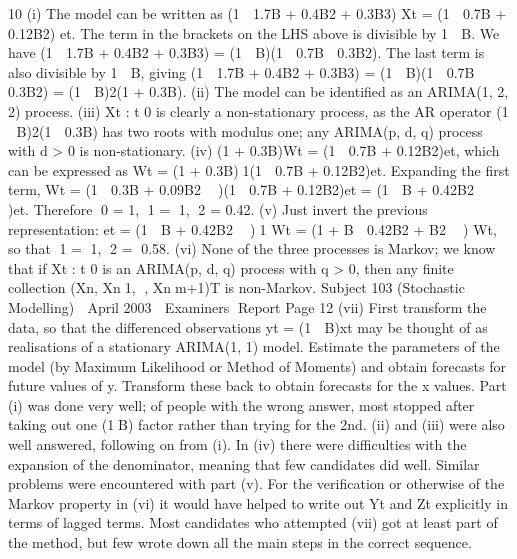 10 (i) The model can be written as
(1  1.7B + 0.4B2 + 0.3B3) Xt = (1  0.7B + 0.12B2) et.
The term in the brackets on the LHS above is divisible by 1  B. We have
(1  1.7B + 0.4B2 + 0.3B3) = (1  B)(1  0.7B  0.3B2).
The last term is also divisible by 1  B, giving
(1  1.7B + 0.4B2 + 0.3B3) = (1  B)(1  0.7B  0.3B2) = (1  B)2(1 + 0.3B).
(ii) The model can be identified as an ARIMA(1, 2, 2) process.
(iii) {Xt : t 
 0} is clearly a non-stationary process, as the AR operator
(1  B)2(1  0.3B) has two roots with modulus one; any ARIMA(p, d, q)
process with d > 0 is non-stationary.
(iv) (1 + 0.3B)Wt = (1  0.7B + 0.12B2)et, which can be expressed as
Wt = (1 + 0.3B)1(1 	0.7B + 0.12B2)et.
Expanding the first term, Wt = (1  0.3B + 0.09B2  )(1  0.7B + 0.12B2)et
= (1  B + 0.42B2  )et.
Therefore 0 = 1, 1 = 1, 2 = 0.42.
(v) Just invert the previous representation: et = (1  B + 0.42B2  )1 Wt = (1 +
B  0.42B2 + B2  ) Wt, so that 1 = 1, 2 = 0.58.
(vi) None of the three processes is Markov; we know that if {Xt : t 
 0} is an
ARIMA(p, d, q) process with q > 0, then any finite collection (Xn, Xn1, ,
Xnm+1)T is non-Markov.
Subject 103 (Stochastic Modelling)  April 2003  Examiners Report
Page 12
(vii) First transform the data, so that the differenced observations yt = (1  B)xt may
be thought of as realisations of a stationary ARIMA(1, 1) model.
Estimate the parameters of the model (by Maximum Likelihood or Method of
Moments) and obtain forecasts for future values of y.
Transform these back to obtain forecasts for the x values.
Part (i) was done very well; of people with the wrong answer, most stopped after
taking out one (1B) factor rather than trying for the 2nd. (ii) and (iii) were also well
answered, following on from (i).
In (iv) there were difficulties with the expansion of the denominator, meaning that few
candidates did well. Similar problems were encountered with part (v).
For the verification or otherwise of the Markov property in (vi) it would have helped
to write out {Yt} and {Zt} explicitly in terms of lagged terms.
Most candidates who attempted (vii) got at least part of the method, but few wrote
down all the main steps in the correct sequence.
